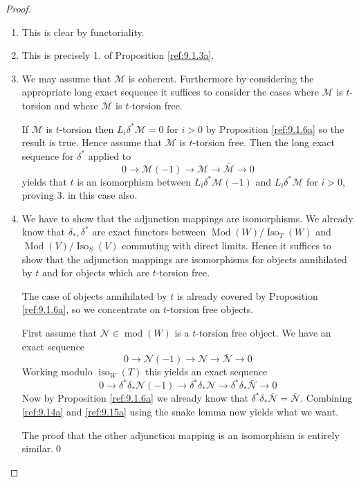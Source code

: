 \documentclass{amsproc}
\def\Mscr{{\mathcal M}}
\def\Nscr{{\mathcal N}}
\def\iso{\operatorname{iso}}
\def\Iso{\operatorname{Iso}}
\def\coh{\operatorname {mod}}
\def\Qch{\operatorname {Mod}}
\def\r{\rightarrow}
\theoremstyle{definition}
\theoremstyle{remark}
\numberwithin{equation}{section}
\numberwithin{table}{section}
\numberwithin{figure}{section}
\begin{document}
\begin{proof}
\begin{enumerate}
\item
This is clear by functoriality.
\item
This is precisely 1. of Proposition \ref{ref:9.1.3a}.
\item
We may assume that $\Mscr$ is coherent.
Furthermore by considering the appropriate long exact sequence it
suffices to consider the cases where $\Mscr$ is $t$-torsion and where
$\Mscr$ is $t$-torsion free.

If $\Mscr$ is $t$-torsion then $L_i\delta^\ast\Mscr=0$ for $i>0$ by
Proposition \ref{ref:9.1.6a} so the result is true. Hence assume that $\Mscr$ is
$t$-torsion free. Then the long exact sequence for $\delta^\ast$
applied to
\[
0\r \Mscr(-1)\r \Mscr\r \bar{\Mscr}\r 0
\]
yields that $t$ is an isomorphism between $L_i\delta^\ast\Mscr(-1)$ and $
L_i\delta^\ast\Mscr$ for $i>0$, proving 3. in this case also.
\item We have to show that the adjunction mappings are isomorphisms.
We already know that $\delta_\ast,\delta^\ast$ are exact functors between
$\Qch(W)/\Iso_T(W)$ and $\Qch(V)/\Iso_S(V)$ commuting with
direct limits. Hence it suffices to show that the adjunction mappings are
isomorphisms for    objects annihilated by $t$ and for objects
which are $t$-torsion free.

The case of objects annihilated by $t$ is already covered by Proposition
\ref{ref:9.1.6a}, so we concentrate on $t$-torsion free objects.

First assume that $\Nscr\in \coh(W)$ is a $t$-torsion free object. 
We have an exact sequence \begin{equation}
\label{ref:9.14a}
0\r \Nscr(-1)\r \Nscr \r \bar{\Nscr}\r 0
\end{equation}
Working modulo $\iso_W(T)$ this yields an exact sequence
\begin{equation}
\label{ref:9.15a}
0\r \delta^\ast\delta_\ast\Nscr(-1)\r \delta^\ast\delta_\ast\Nscr \r 
\delta^\ast\delta_\ast\bar{\Nscr}\r 0
\end{equation}
Now by  Proposition \ref{ref:9.1.6a} we already know that 
$ \delta^\ast\delta_\ast\bar{\Nscr}=\bar{\Nscr}$. Combining \eqref{ref:9.14a}
and \eqref{ref:9.15a} using the snake lemma now yields what we want.

The proof that the other adjunction mapping is an isomorphism is entirely
similar.\qed
\end{enumerate}
\def\qed{}\end{proof}
\end{document}

